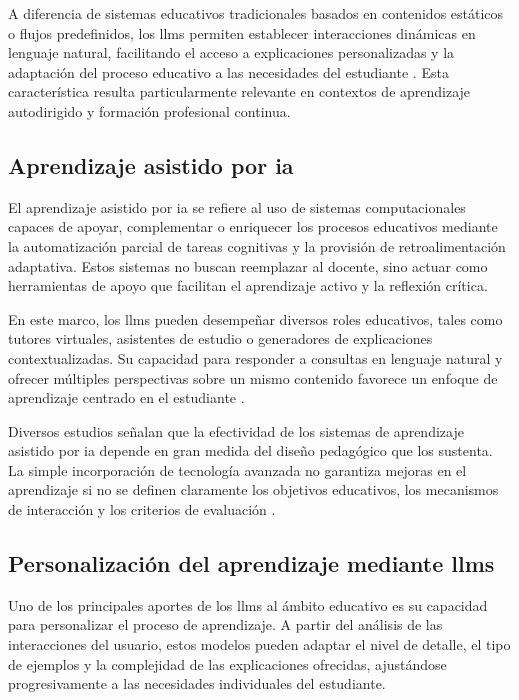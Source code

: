 A diferencia de sistemas educativos tradicionales basados en contenidos estáticos o flujos predefinidos, los \glspl{llm} permiten establecer interacciones dinámicas en lenguaje natural, facilitando el acceso a explicaciones personalizadas y la adaptación del proceso educativo a las necesidades del estudiante \parencite{kasneci2023chatgpt}. Esta característica resulta particularmente relevante en contextos de aprendizaje autodirigido y formación profesional continua.

\subsection{Aprendizaje asistido por \gls{ia}}

El aprendizaje asistido por \gls{ia} se refiere al uso de sistemas computacionales capaces de apoyar, complementar o enriquecer los procesos educativos mediante la automatización parcial de tareas cognitivas y la provisión de retroalimentación adaptativa. Estos sistemas no buscan reemplazar al docente, sino actuar como herramientas de apoyo que facilitan el aprendizaje activo y la reflexión crítica.

En este marco, los \glspl{llm} pueden desempeñar diversos roles educativos, tales como tutores virtuales, asistentes de estudio o generadores de explicaciones contextualizadas. Su capacidad para responder a consultas en lenguaje natural y ofrecer múltiples perspectivas sobre un mismo contenido favorece un enfoque de aprendizaje centrado en el estudiante \parencite{kasneci2023chatgpt}.

Diversos estudios señalan que la efectividad de los sistemas de aprendizaje asistido por \gls{ia} depende en gran medida del diseño pedagógico que los sustenta. La simple incorporación de tecnología avanzada no garantiza mejoras en el aprendizaje si no se definen claramente los objetivos educativos, los mecanismos de interacción y los criterios de evaluación \parencite{kasneci2023chatgpt}.

\subsection{Personalización del aprendizaje mediante \glspl{llm}}

Uno de los principales aportes de los \glspl{llm} al ámbito educativo es su capacidad para personalizar el proceso de aprendizaje. A partir del análisis de las interacciones del usuario, estos modelos pueden adaptar el nivel de detalle, el tipo de ejemplos y la complejidad de las explicaciones ofrecidas, ajustándose progresivamente a las necesidades individuales del estudiante.


